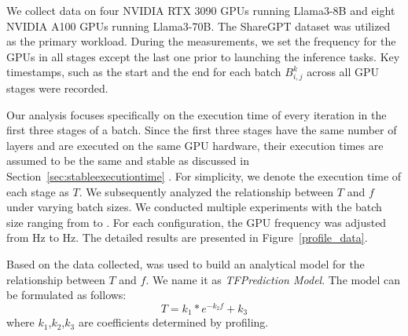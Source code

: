 

We collect data on four NVIDIA RTX 3090 GPUs running Llama3-8B and eight NVIDIA A100 GPUs running Llama3-70B.
The ShareGPT dataset\cite{chiang2023vicuna} was utilized as the primary workload.
During the measurements, we set the frequency for the GPUs in all stages except the last one prior to launching the inference tasks. 
Key timestamps, such as the start and the end for each batch $B_{i,j}^{k}$ across all GPU stages were recorded.

Our analysis focuses specifically on the execution time of every iteration in the first three stages of a batch.
Since the first three stages have the same number of layers and are executed on the same GPU hardware, their execution times are assumed to be the same and stable as discussed in Section~\ref{sec:stableexecutiontime} . 
For simplicity, we denote the execution time of each stage as $T$. 
We subsequently analyzed the relationship between $T$ and $f$ under varying batch sizes.
We conducted multiple experiments with the batch size ranging from  to .
For each configuration, the GPU frequency was adjusted from Hz to Hz.
The detailed results are presented in Figure~\ref{profile_data}.



Based on the data collected, \thisproj{} was used to build an analytical model for the relationship between $T$ and $f$.
We name it as \textit{TFPrediction Model}.
The model can be formulated as follows: 
\begin{equation}
T=k_1*e^{-k_2f}+k_3
\label{model}
\end{equation} where $k_1$,$k_2$,$k_3$ are coefficients determined by profiling.


